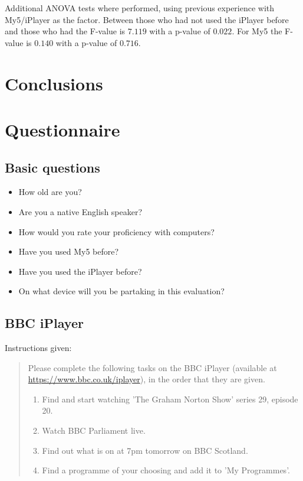 \documentclass[12pt,a4paper,x11names]{article}
\begin{document}
Additional ANOVA tests where performed, using previous experience with My5/iPlayer as the factor. Between those who had not used the iPlayer before and those who had the F-value is $7.119$ with a p-value of $0.022$. For My5 the F-value is $0.140$ with a p-value of $0.716$.

\section{Conclusions}

\newpage{}
\printbibliography[title=Bibliography,heading=bibintoc]{}

\appendix{}

\section{Questionnaire}
\subsection{Basic questions}
\begin{itemize}
\item How old are you?
\item Are you a native English speaker?
\item How would you rate your proficiency with computers?
\item Have you used My5 before?
\item Have you used the iPlayer before?
\item On what device will you be partaking in this evaluation?
\end{itemize}

\subsection{BBC iPlayer}
Instructions given:
\begin{quote}
Please complete the following tasks on the BBC iPlayer (available at \url{https://www.bbc.co.uk/iplayer}), in the order that they are given.

\begin{enumerate}
\item Find and start watching 'The Graham Norton Show' series 29, episode 20.
\item Watch BBC Parliament live.
\item Find out what is on at 7pm tomorrow on BBC Scotland.
\item Find a programme of your choosing and add it to 'My Programmes'.
\end{enumerate}
\end{quote}
\end{document}
